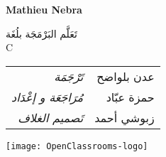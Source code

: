 \thispagestyle{empty}
\cleardoublepage
\thispagestyle{empty}
\begin{center}
{\fontsize{0.7cm}{1.4cm}\selectfont\bfseries
\textcolor{section}{\textenglish{Mathieu Nebra}}
}

\vspace{1cm}
\textcolor{chapter}{\mdseries
{\fontsize{2cm}{4cm}\selectfont
تَعَلَّم البَرْمَجَة بلُغَة}\\
{\fontsize{3cm}{6cm}\selectfont
\textenglish{C}
}
}

\vfill

{
\fontsize{0.5cm}{1.5cm}\selectfont

\begin{tabu} to 0.5
تَرْجَمَة & عدن بلواضح\\
مُرَاجَعَة و إعْدَاد & حمزة عبّاد\\
تَصميم الغلاف & زبوشي أحمد\\
\end{tabu}
}

\vfill
\texttt{[image: OpenClassrooms-logo]}
\end{center}
